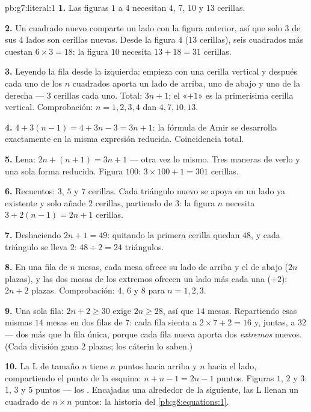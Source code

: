 \begin{solution}{pb:g7:literal:1}
\textbf{1.} Las figuras $1$ a $4$ necesitan $4$, $7$, $10$ y $13$
cerillas.

\textbf{2.} Un cuadrado nuevo comparte un lado con la figura
anterior, así que solo $3$ de sus $4$ lados son cerillas nuevas. Desde la
figura $4$ ($13$ cerillas), seis cuadrados más cuestan
$6 \times 3 = 18$: la figura $10$ necesita $13 + 18 = 31$ cerillas.

\textbf{3.} Leyendo la fila desde la izquierda: empieza con una
cerilla vertical y después cada uno de los $n$ cuadrados aporta un
lado de arriba, uno de abajo y uno de la derecha --- $3$ cerillas cada uno. Total:
$3n + 1$; el «$+1$» es la primerísima cerilla vertical. Comprobación:
$n = 1, 2, 3, 4$ dan $4, 7, 10, 13$.

\textbf{4.} $4 + 3(n - 1) = 4 + 3n - 3 = 3n + 1$: la fórmula de Amir
se desarrolla exactamente en la misma expresión reducida. Coincidencia
total.

\textbf{5.} Lena: $2n + (n + 1) = 3n + 1$ --- otra vez lo mismo.
Tres maneras de verlo y una sola forma reducida. Figura $100$:
$3 \times 100 + 1 = 301$ cerillas.

\textbf{6.} Recuentos: $3$, $5$ y $7$ cerillas. Cada triángulo nuevo
se apoya en un lado ya existente y solo añade $2$ cerillas, partiendo
de $3$: la figura $n$ necesita $3 + 2(n - 1) = 2n + 1$ cerillas.

\textbf{7.} Deshaciendo $2n + 1 = 49$: quitando la primera cerilla quedan
$48$, y cada triángulo se lleva $2$:
$48 \div 2 = 24$ triángulos.

\textbf{8.} En una fila de $n$ mesas, cada mesa ofrece su lado
de arriba y el de abajo ($2n$ plazas), y las dos mesas de los extremos ofrecen un
lado más cada una ($+2$): $2n + 2$ plazas. Comprobación: $4$, $6$ y $8$
para $n = 1, 2, 3$.

\textbf{9.} Una sola fila: $2n + 2 \geq 30$ exige $2n \geq 28$, así que
$14$ mesas. Repartiendo esas mismas $14$ mesas en dos filas de
$7$: cada fila sienta a $2 \times 7 + 2 = 16$ y, juntas, a $32$ ---
dos más que la fila única, porque cada fila nueva aporta dos
\emph{extremos} nuevos. (Cada división gana $2$ plazas; los cáterin lo saben.)

\textbf{10.} La L de tamaño $n$ tiene $n$ puntos hacia arriba y $n$
hacia el lado, compartiendo el punto de la esquina: $n + n - 1 = 2n - 1$ puntos.
Figuras $1$, $2$ y $3$: $1$, $3$ y $5$ puntos --- los \emph{}. Encajadas una alrededor de la siguiente, las L llenan un
cuadrado de $n \times n$ puntos: la historia del
\cref{pb:g8:equations:1}.


\end{solution}
